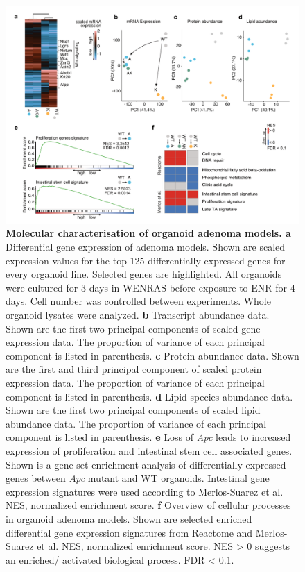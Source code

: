 \begin{flushleft}
\begin{figure}[H]
\centering
\includegraphics[width=\textwidth,
                height=\textheight,
                keepaspectratio]{figures/adenomaprofiling/pdf/fig_1_6_1_2.pdf}
\caption[Molecular characterisation of organoid adenoma models]{\textbf{Molecular characterisation of organoid adenoma models. a} Differential gene expression of adenoma models. Shown are scaled expression values for the top 125 differentially expressed genes for every organoid line. Selected genes are highlighted. All organoids were cultured for 3 days in WENRAS before exposure to ENR for 4 days. Cell number was controlled between experiments. Whole organoid lysates were analyzed. 
\textbf{b} Transcript abundance data. Shown are the first two principal components of scaled gene expression data. The proportion of variance of each principal component is listed in parenthesis. 
\textbf{c} Protein abundance data. Shown are the first and third principal component of scaled protein expression data. The proportion of variance of each principal component is listed in parenthesis. 
\textbf{d} Lipid species abundance data. Shown are the first two principal components of scaled lipid abundance data. The proportion of variance of each principal component is listed in parenthesis. 
\textbf{e} Loss of \textit{Apc} leads to increased expression of proliferation and intestinal stem cell associated genes. Shown is a gene set enrichment analysis of differentially expressed genes between \textit{Apc} mutant and WT organoids. Intestinal gene expression signatures were used according to Merlos-Suarez et al. NES, normalized enrichment score. 
\textbf{f} Overview of cellular processes in organoid adenoma models. Shown are selected enriched differential gene expression signatures from Reactome and Merlos-Suarez et al. NES, normalized enrichment score. NES > 0 suggests an enriched/ activated biological process. FDR < 0.1.}
\label{fig_161}
\end{figure}
\bigbreak


\end{flushleft}
